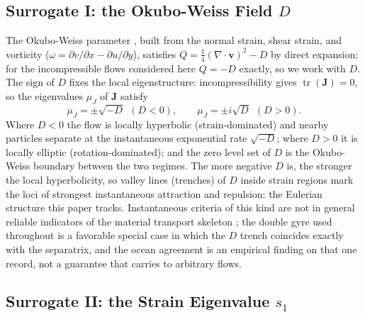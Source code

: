 \documentclass[lettersize,journal]{IEEEtran}
\begin{document}
\label{sec:separatrix}
\subsection{Surrogate I: the Okubo-Weiss Field $D$}

The Okubo-Weiss parameter \cite{21,22}, built from the normal strain,
shear strain, and vorticity
($\omega = \partial v/\partial x - \partial u/\partial y$), satisfies
$Q = \tfrac{1}{4}(\nabla \cdot \mathbf{v})^2 - D$ by direct expansion;
for the incompressible flows considered here $Q = -D$ exactly, so we
work with $D$. The sign of $D$ fixes the local eigenstructure:
incompressibility gives $\operatorname{tr}(\mathbf{J}) = 0$, so the
eigenvalues $\mu_J$ of $\mathbf{J}$ satisfy
\begin{equation}
    \mu_J = \pm\sqrt{-D} \ \ (D < 0), \qquad
    \mu_J = \pm i\sqrt{D} \ \ (D > 0).
    \label{eq:eig_detj}
\end{equation}
Where $D < 0$ the flow is locally hyperbolic (strain-dominated) and
nearby particles separate at the instantaneous exponential rate
$\sqrt{-D}$; where $D > 0$ it is locally elliptic (rotation-dominated);
and the zero level set of $D$ is the Okubo-Weiss boundary between the
two regimes. The more negative $D$ is, the stronger the local
hyperbolicity, so valley lines (trenches) of $D$ inside strain regions
mark the loci of strongest instantaneous attraction and repulsion: the
Eulerian structure this paper tracks. Instantaneous criteria of this
kind are not in general reliable indicators of the material transport
skeleton \cite{16}; the double gyre used throughout is a favorable
special case in which the $D$ trench coincides exactly with the
separatrix, and the ocean agreement is an empirical finding on that one
record, not a guarantee that carries to arbitrary flows.

\subsection{Surrogate II: the Strain Eigenvalue $s_1$}
\label{sec:strain_field}
\end{document}
